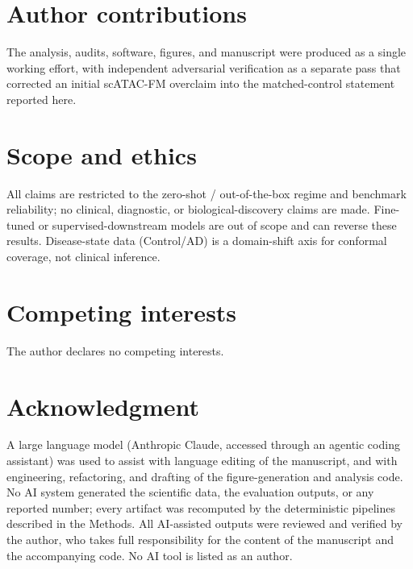 \documentclass[journal]{IEEEtran}
\begin{document}
\section*{Author contributions}
The analysis, audits, software, figures, and manuscript were produced as a single working effort, with independent adversarial verification as a separate pass that corrected an initial scATAC-FM overclaim into the matched-control statement reported here.

\section*{Scope and ethics}
All claims are restricted to the zero-shot / out-of-the-box regime and benchmark reliability; no clinical, diagnostic, or biological-discovery claims are made. Fine-tuned or supervised-downstream models are out of scope and can reverse these results. Disease-state data (Control/AD) is a domain-shift axis for conformal coverage, not clinical inference.

\section*{Competing interests}
The author declares no competing interests.



\section*{Acknowledgment}
A large language model (Anthropic Claude, accessed through an agentic coding 
assistant) was used to assist with language editing of the manuscript, and with
engineering, refactoring, and drafting of the figure-generation and analysis
code. No AI system generated the scientific data, the evaluation outputs, or any
reported number; every artifact was recomputed by the deterministic pipelines
described in the Methods. All AI-assisted outputs were reviewed and verified by
the author, who takes full responsibility for the content of the manuscript and
the accompanying code. No AI tool is listed as an author.



\end{document}
